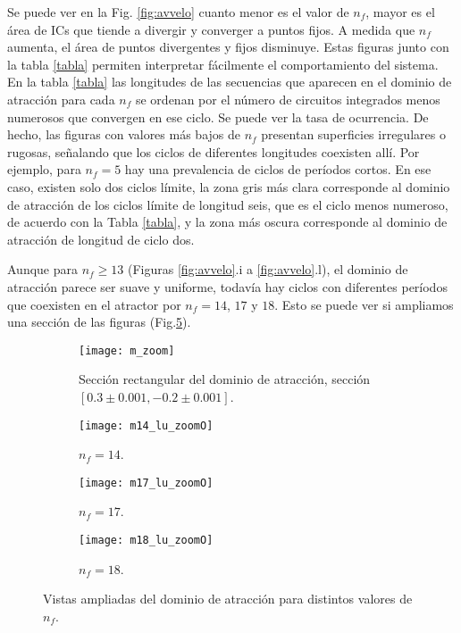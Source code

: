 Se puede ver en la Fig. \ref{fig:avvelo} cuanto menor es el valor de $n_f$, mayor es el área de ICs que tiende a divergir y converger a puntos fijos.
A medida que $n_f$ aumenta, el área de puntos divergentes y fijos disminuye.
Estas figuras junto con la tabla \ref{tabla} permiten interpretar fácilmente el comportamiento del sistema.
En la tabla \ref{tabla} las longitudes de las secuencias que aparecen en el dominio de atracción para cada $n_f$ se ordenan por el número de circuitos integrados menos numerosos que convergen en ese ciclo.
Se puede ver la tasa de ocurrencia.
De hecho, las figuras con valores más bajos de $n_f$ presentan superficies irregulares o rugosas, señalando que los ciclos de diferentes longitudes coexisten allí.
Por ejemplo, para $n_f = 5$ hay una prevalencia de ciclos de períodos cortos.
En ese caso, existen solo dos ciclos límite, la zona gris más clara corresponde al dominio de atracción de los ciclos límite de longitud seis, que es el ciclo menos numeroso, de acuerdo con la Tabla \ref{tabla}, y la zona más oscura corresponde al dominio de atracción de longitud de ciclo dos.

Aunque para $n_f \geqslant 13$ (Figuras \ref{fig:avvelo}.i a \ref{fig:avvelo}.l), el dominio de atracción parece ser suave y uniforme, todavía hay ciclos con diferentes períodos que coexisten en el atractor por $ n_f = 14 $, $ 17 $ y $ 18 $.
Esto se puede ver si ampliamos una sección de las figuras (Fig.\ref{fig:m_zoom}).
%
\begin{figure}
	\centering
	\begin{subfigure}[t]{0.49\textwidth}
		\texttt{[image: m\_zoom]}
		\caption{Sección rectangular del dominio de atracción, sección $[0.3\pm 0.001, -0.2\pm 0.001]$.}
		\label{fig:gull}
	\end{subfigure}
	\hfill 
	\begin{subfigure}[t]{0.49\textwidth}
		\texttt{[image: m14\_lu\_zoomO]}
		\caption{$n_f=14$.}
		\label{fig:tiger}
	\end{subfigure}
	\hfill  
	\begin{subfigure}[t]{0.49\textwidth}
		\texttt{[image: m17\_lu\_zoomO]}
		\caption{$n_f=17$.}
		\label{fig:mouse}
	\end{subfigure}
	\hfill   
	\begin{subfigure}[t]{0.49\textwidth}
		\texttt{[image: m18\_lu\_zoomO]}
		\caption{$n_f=18$.}
		\label{fig:mouse}
	\end{subfigure}
	\caption{Vistas ampliadas del dominio de atracción para distintos valores de $n_f$.}\label{fig:m_zoom}
\end{figure}

